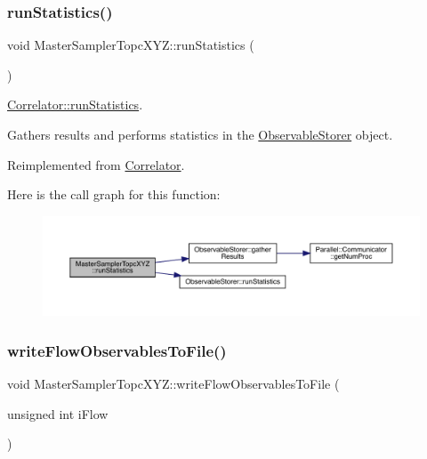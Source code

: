 \subsubsection{\texorpdfstring{runStatistics()}{runStatistics()}}
{\footnotesize\ttfamily void Master\+Sampler\+Topc\+X\+Y\+Z\+::run\+Statistics (\begin{DoxyParamCaption}{ }\end{DoxyParamCaption})\hspace{0.3cm}{\ttfamily [virtual]}}



\mbox{\hyperlink{class_correlator_a35197b1d12b62ef30b79c0138a26456e}{Correlator\+::run\+Statistics}}. 

Gathers results and performs statistics in the \mbox{\hyperlink{class_observable_storer}{Observable\+Storer}} object. 

Reimplemented from \mbox{\hyperlink{class_correlator_a35197b1d12b62ef30b79c0138a26456e}{Correlator}}.

Here is the call graph for this function\+:\nopagebreak
\begin{figure}[H]
\begin{center}
\leavevmode
\includegraphics[width=350pt]{class_master_sampler_topc_x_y_z_af748653ded9908f78383185475b9ddeb_cgraph}
\end{center}
\end{figure}
\mbox{\label{class_master_sampler_topc_x_y_z_a4fba4290e4406e18ef3f2904c6ae364f}} 
\subsubsection{\texorpdfstring{writeFlowObservablesToFile()}{writeFlowObservablesToFile()}}
{\footnotesize\ttfamily void Master\+Sampler\+Topc\+X\+Y\+Z\+::write\+Flow\+Observables\+To\+File (\begin{DoxyParamCaption}\item[{unsigned int}]{i\+Flow }\end{DoxyParamCaption})\hspace{0.3cm}{\ttfamily [virtual]}}



